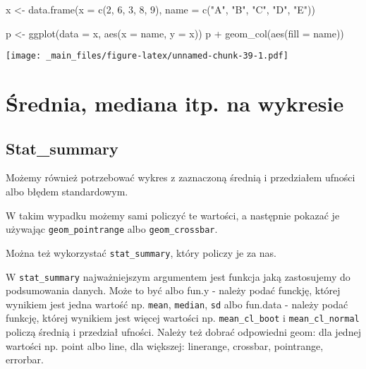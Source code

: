 \documentclass[
]{book}
\newenvironment{Shaded}{\begin{snugshade}}{\end{snugshade}}
\newcommand{\AttributeTok}[1]{\textcolor[rgb]{0.77,0.63,0.00}{#1}}
\newcommand{\DecValTok}[1]{\textcolor[rgb]{0.00,0.00,0.81}{#1}}
\newcommand{\FunctionTok}[1]{\textcolor[rgb]{0.00,0.00,0.00}{#1}}
\newcommand{\NormalTok}[1]{#1}
\newcommand{\OtherTok}[1]{\textcolor[rgb]{0.56,0.35,0.01}{#1}}
\newcommand{\SpecialCharTok}[1]{\textcolor[rgb]{0.00,0.00,0.00}{#1}}
\newcommand{\StringTok}[1]{\textcolor[rgb]{0.31,0.60,0.02}{#1}}
\begin{document}
\begin{Shaded}
\begin{Highlighting}[]
\NormalTok{x }\OtherTok{\textless{}{-}} \FunctionTok{data.frame}\NormalTok{(}\AttributeTok{x =} \FunctionTok{c}\NormalTok{(}\DecValTok{2}\NormalTok{, }\DecValTok{6}\NormalTok{, }\DecValTok{3}\NormalTok{, }\DecValTok{8}\NormalTok{, }\DecValTok{9}\NormalTok{), }\AttributeTok{name =} \FunctionTok{c}\NormalTok{(}\StringTok{"A"}\NormalTok{, }\StringTok{"B"}\NormalTok{, }\StringTok{"C"}\NormalTok{, }\StringTok{"D"}\NormalTok{, }\StringTok{"E"}\NormalTok{))}

\NormalTok{p }\OtherTok{\textless{}{-}} \FunctionTok{ggplot}\NormalTok{(}\AttributeTok{data =}\NormalTok{ x, }\FunctionTok{aes}\NormalTok{(}\AttributeTok{x =}\NormalTok{ name, }\AttributeTok{y =}\NormalTok{ x))}
\NormalTok{p }\SpecialCharTok{+} \FunctionTok{geom\_col}\NormalTok{(}\FunctionTok{aes}\NormalTok{(}\AttributeTok{fill =}\NormalTok{ name))}
\end{Highlighting}
\end{Shaded}

\texttt{[image: \_main\_files/figure-latex/unnamed-chunk-39-1.pdf]}

\hypertarget{ux15brednia-mediana-itp.-na-wykresie}{%
\section{Średnia, mediana itp. na wykresie}\label{ux15brednia-mediana-itp.-na-wykresie}}

\hypertarget{stat_summary}{%
\subsection{Stat\_summary}\label{stat_summary}}

Możemy również potrzebować wykres z zaznaczoną średnią i przedziałem ufności albo błędem standardowym.

W takim wypadku możemy sami policzyć te wartości, a następnie pokazać je używając \texttt{geom\_pointrange} albo \texttt{geom\_crossbar}.

Można też wykorzystać \texttt{stat\_summary}, który policzy je za nas.

W \texttt{stat\_summary} najważniejszym argumentem jest funkcja jaką zastosujemy do podsumowania danych. Może to być albo fun.y - należy podać funckję, której wynikiem jest jedna wartość np. \texttt{mean}, \texttt{median}, \texttt{sd} albo fun.data - należy podać funkcję, której wynikiem jest więcej wartości np. \texttt{mean\_cl\_boot} i \texttt{mean\_cl\_normal} policzą średnią i przedział ufności. Należy też dobrać odpowiedni geom: dla jednej wartości np. point albo line, dla większej: linerange, crossbar, pointrange, errorbar.
\end{document}
